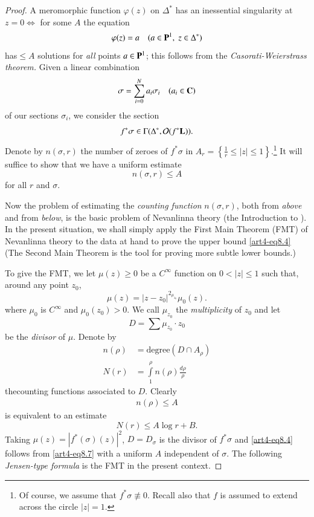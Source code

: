 \begin{proof}
A meromorphic function $\varphi (z)$ on $\Delta^\ast$ has an inessential singularity at $z =0 \Leftrightarrow $  for some $A$ the equation
$$
\varphi (z) = a \quad (a \in\mathbf{P}^1, \; z \in \Delta^\ast)
$$
has\pageoriginale $\leqslant A$ solutions for \textit{all} points $a \in \mathbf{P}^1$; this follows from the \textit{Casorati-Weierstrass theorem.} Given a linear combination
$$
\sigma = \sum\limits^N_{i=0} a_i \sigma_i \quad (a_i \in \mathbf{C})
$$
of our sections $\sigma_i$, we consider the section
$$
f^\ast \sigma \in \Gamma (\Delta^\ast, \mathcal{O} (f^\ast \mathbf{L})).
$$
Denote by $n (\sigma, r)$ the number of zeroes of $f^\ast \sigma$ in $A_r = \left\{\frac{1}{r} \leqslant |z| \leqslant 1 \right\}$.\footnote[35]{Of course, we assume that $f^\ast \sigma \not\equiv 0$. Recall also that $f$ is assumed to extend across the circle $|z| =1$.} It will suffice to show that we have a uniform estimate
\setcounter{equation}{3}
\begin{equation}
n(\sigma, r) \leqslant A\label{art4-eq8.4} 
\end{equation}
for all $r$ and $\sigma$.

Now the problem of estimating the \textit{counting function} $n (\sigma, r)$, both from \textit{above} and from \textit{below}, is the basic problem of Nevanlinna theory (\cf the Introduction to \cite{art4-key24}). In the present situation, we shall simply apply the First Main Theorem (FMT) of Nevanlinna theory to the data at hand to prove the upper bound \eqref{art4-eq8.4} (The Second Main Theorem is the tool for proving more subtle lower bounds.)

To give the FMT, we let $\mu(z) \geqslant 0$ be a $C^\infty$ function on $0 < |z| \leqslant 1$ such that, around any point $z_0$,
\begin{equation}
\mu(z) = |z - z_0|^{2_{\mu_{z_0}}} \mu_0 (z).
\label{art4-eq8.5}
\end{equation}
where $\mu_0$ is $C^\infty$ and $\mu_0 (z_0) > 0$. We call $\mu_{z_0}$ the \textit{multiplicity} of $z_0$ and let 
$$
D = \sum \mu_{z_0} \cdot z_0
$$
be the \textit{divisor} of $\mu$. Denote by 
\begin{align*}
n (\rho) & = \text{degree} (D \cap A_\rho)\\
N(r) & = \int\limits^\rho_1 n (\rho) \frac{d\rho}{\rho}
 \end{align*}
the\pageoriginale counting functions associated to $D$. Clearly
\begin{align}
n (\rho) \leqslant A \label{art4-eq8.6}
\end{align}
is equivalent to an estimate
\begin{equation}
N(r) \leqslant A \log r + B. \label{art4-eq8.7}
\end{equation}
Taking $\mu(z) = |f^\ast (\sigma) (z)|^2$, $D = D_\sigma$ is the divisor of $f^\ast \sigma$ and \eqref{art4-eq8.4} follows from \eqref{art4-eq8.7} with a uniform $A$ independent of $\sigma$. The following \textit{Jensen-type formula} is the FMT in the present context.
\end{proof}

